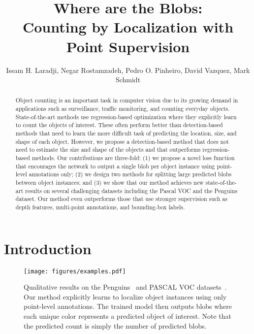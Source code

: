 \documentclass[runningheads]{llncs}
\begin{document}
\pagestyle{headings}
\mainmatter

\title{Where are the Blobs:\\ Counting by Localization with Point Supervision}

\author{Issam H. Laradji, Negar Rostamzadeh, Pedro O. Pinheiro, David Vazquez, Mark Schmidt}

\maketitle

\begin{abstract}
Object counting is an important task in computer vision due to its growing demand in applications such as surveillance, traffic monitoring, and counting everyday objects. State-of-the-art methods use regression-based optimization where they explicitly learn to count the objects of interest. These often perform better than detection-based methods that need to learn the more difficult task of predicting the location, size, and shape of each object. However, we propose a detection-based method that does not need to estimate the size and shape of the objects and that outperforms regression-based methods. Our contributions are three-fold: (1) we propose a novel loss function that encourages the network to output a single blob per object instance using point-level annotations only; (2) we design two methods for splitting large predicted blobs between object instances; and (3) we show that our method achieves new state-of-the-art results on several challenging datasets including the Pascal VOC and the Penguins dataset. Our method even outperforms those that use stronger supervision such as depth features, multi-point annotations, and bounding-box labels. 



\end{abstract}

\section{Introduction}
\label{sec:introduction}
\begin{figure}[t]
\centering
\texttt{[image: figures/examples.pdf]}
\caption{Qualitative results on the Penguins~\cite{arteta2016counting} and PASCAL VOC datasets~\cite{everingham2015pascal}. Our method explicitly learns to localize object instances using only point-level annotations. The trained model then outputs blobs where each unique color represents a predicted object of interest. Note that the predicted count is simply the number of predicted blobs.}
\label{fig:res-qualitative}
\end{figure}
\end{document}
